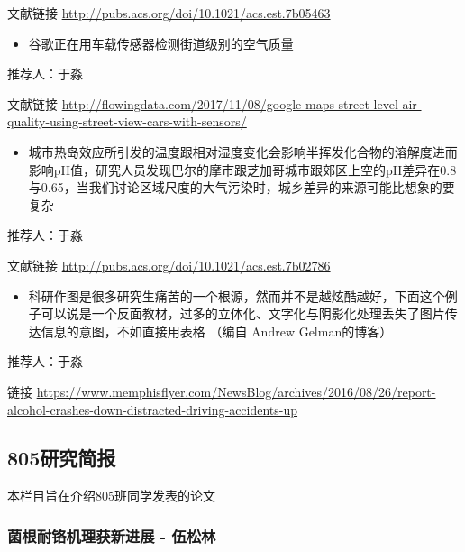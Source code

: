 \documentclass[]{book}
\providecommand{\tightlist}{%
  \setlength{\itemsep}{0pt}\setlength{\parskip}{0pt}}
\begin{document}
文献链接 \url{http://pubs.acs.org/doi/10.1021/acs.est.7b05463}

\begin{itemize}
\tightlist
\item
  谷歌正在用车载传感器检测街道级别的空气质量
\end{itemize}

推荐人：于淼

文献链接 \url{http://flowingdata.com/2017/11/08/google-maps-street-level-air-quality-using-street-view-cars-with-sensors/}

\begin{itemize}
\tightlist
\item
  城市热岛效应所引发的温度跟相对湿度变化会影响半挥发化合物的溶解度进而影响pH值，研究人员发现巴尔的摩市跟芝加哥城市跟郊区上空的pH差异在0.8与0.65，当我们讨论区域尺度的大气污染时，城乡差异的来源可能比想象的要复杂
\end{itemize}

推荐人：于淼

文献链接 \url{http://pubs.acs.org/doi/10.1021/acs.est.7b02786}

\begin{itemize}
\tightlist
\item
  科研作图是很多研究生痛苦的一个根源，然而并不是越炫酷越好，下面这个例子可以说是一个反面教材，过多的立体化、文字化与阴影化处理丢失了图片传达信息的意图，不如直接用表格 （编自 Andrew Gelman的博客）
\end{itemize}

推荐人：于淼

链接 \url{https://www.memphisflyer.com/NewsBlog/archives/2016/08/26/report-alcohol-crashes-down-distracted-driving-accidents-up}

\hypertarget{ux7814ux7a76ux7b80ux62a5}{%
\subsection*{805研究简报}\label{ux7814ux7a76ux7b80ux62a5}}

本栏目旨在介绍805班同学发表的论文

\hypertarget{ux83ccux6839ux8010ux94ecux673aux7406ux83b7ux65b0ux8fdbux5c55---ux4f0dux677eux6797}{%
\subsubsection*{菌根耐铬机理获新进展 - 伍松林}\label{ux83ccux6839ux8010ux94ecux673aux7406ux83b7ux65b0ux8fdbux5c55---ux4f0dux677eux6797}}
\end{document}
